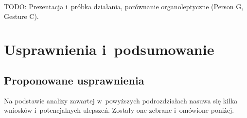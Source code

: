       \newpage
      TODO: Prezentacja i~próbka działania, porównanie organoleptyczne (Person G, Gesture C).

\chapter{Usprawnienia i~podsumowanie}\label{Chapter_Podsumowanie}

  \section{Proponowane usprawnienia}\label{Section_Usprawnienia}

    Na podstawie analizy zawartej w~powyższych podrozdziałach nasuwa się kilka wniosków i~potencjalnych ulepszeń. Zostały one zebrane i~omówione poniżej.

